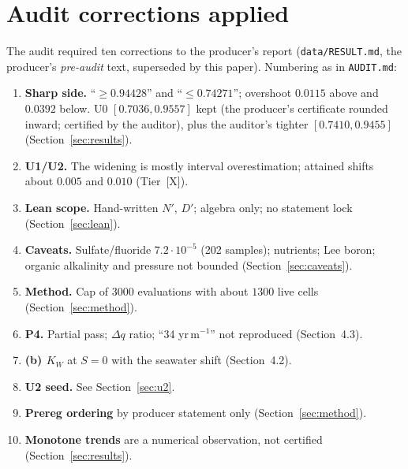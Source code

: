 \documentclass[10pt]{article}
\newcommand{\tier}[1]{\textsf{[#1]}}
\newcommand{\tX}{\tier{X}}
\begin{document}
\section{Audit corrections applied}\label{sec:corr}
The audit required ten corrections to the producer's report (\texttt{data/RESULT.md}, the producer's \emph{pre-audit} text, superseded by this paper). Numbering as in \texttt{AUDIT.md}:
\begin{enumerate}\itemsep=1pt
\item \textbf{Sharp side.} ``$\ge0.94428$'' and ``$\le0.74271$''; overshoot $0.0115$ above and $0.0392$ below. U0 $[0.7036,0.9557]$ kept (the producer's certificate rounded inward; certified by the auditor), plus the auditor's tighter $[0.7410,0.9455]$ (Section~\ref{sec:results}).
\item \textbf{U1/U2.} The widening is mostly interval overestimation; attained shifts about $0.005$ and $0.010$ (Tier~\tX{}).
\item \textbf{Lean scope.} Hand-written $N'$, $D'$; algebra only; no statement lock (Section~\ref{sec:lean}).
\item \textbf{Caveats.} Sulfate/fluoride $7.2\cdot10^{-5}$ (202 samples); nutrients; Lee boron; organic alkalinity and pressure not bounded (Section~\ref{sec:caveats}).
\item \textbf{Method.} Cap of $3000$ evaluations with about $1300$ live cells (Section~\ref{sec:method}).
\item \textbf{P4.} Partial pass; $\Delta q$ ratio; ``34 yr\,m$^{-1}$'' not reproduced (Section~4.3).
\item \textbf{(b) $K_W$} at $S=0$ with the seawater shift (Section~4.2).
\item \textbf{U2 seed.} See Section~\ref{sec:u2}.
\item \textbf{Prereg ordering} by producer statement only (Section~\ref{sec:method}).
\item \textbf{Monotone trends} are a numerical observation, not certified (Section~\ref{sec:results}).
\end{enumerate}

\end{document}
